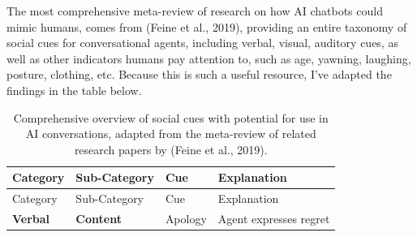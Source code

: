 \documentclass[
  12pt,
  letterpaper,
  DIV=11,
  numbers=noendperiod]{scrartcl}
\begin{document}
The most comprehensive meta-review of research on how AI chatbots could
mimic humans, comes from (Feine et al., 2019), providing an entire
taxonomy of social cues for conversational agents, including verbal,
visual, auditory cues, as well as other indicators humans pay attention
to, such as age, yawning, laughing, posture, clothing, etc. Because this
is such a useful resource, I've adapted the findings in the table below.

\def\pandoctableshortcapt{Social Cues in AI Conversations}

\begin{longtable}[]{@{}
  >{\raggedright\arraybackslash}p{}
  >{\raggedright\arraybackslash}p{}
  >{\raggedright\arraybackslash}p{}
  >{\raggedright\arraybackslash}p{}@{}}
\caption[Social Cues in AI Conversations]{Comprehensive overview of
social cues with potential for use in AI conversations, adapted from the
meta-review of related research papers by (Feine et al.,
2019).}\tabularnewline
\toprule\noalign{}
\begin{minipage}[b]{\linewidth}\raggedright
Category
\end{minipage} & \begin{minipage}[b]{\linewidth}\raggedright
Sub-Category
\end{minipage} & \begin{minipage}[b]{\linewidth}\raggedright
Cue
\end{minipage} & \begin{minipage}[b]{\linewidth}\raggedright
Explanation
\end{minipage} \\
\midrule\noalign{}
\endfirsthead
\toprule\noalign{}
\begin{minipage}[b]{\linewidth}\raggedright
Category
\end{minipage} & \begin{minipage}[b]{\linewidth}\raggedright
Sub-Category
\end{minipage} & \begin{minipage}[b]{\linewidth}\raggedright
Cue
\end{minipage} & \begin{minipage}[b]{\linewidth}\raggedright
Explanation
\end{minipage} \\
\midrule\noalign{}
\endhead
\bottomrule\noalign{}
\endlastfoot
\textbf{Verbal} & \textbf{Content} & Apology & Agent expresses regret

\end{longtable}
\end{document}
